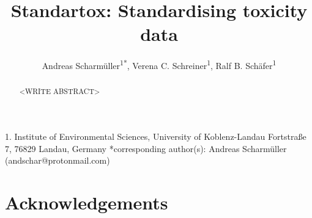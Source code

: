 \documentclass[english]{article}
\begin{document}
\title{Standartox: Standardising toxicity data}

\author{Andreas Scharm{\"u}ller\textsuperscript{1{*}},
        Verena C. Schreiner\textsuperscript{1},
        Ralf B. Sch{\"a}fer\textsuperscript{1}}

\maketitle

1. Institute of Environmental Sciences, University of Koblenz-Landau Fortstraße 7, 76829 Landau, Germany {*}corresponding author(s):
Andreas Scharm{\"u}ller (andschar@protonmail.com)

\begin{abstract}

<WRITE ABSTRACT>

\end{abstract}
\pagebreak














 

\section*{Acknowledgements}
\end{document}
